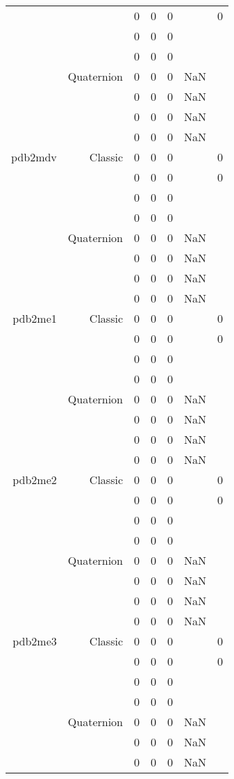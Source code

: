 \begin{xltabular}{\textwidth}{r|rcccSc}
& & 0 & 0 & 0 & & 0 \\
& & 0 & 0 & 0 & & \\
& & 0 & 0 & 0 & & \\
& Quaternion & 0 & 0 & 0 & NaN & \\
& & 0 & 0 & 0 & NaN & \\
& & 0 & 0 & 0 & NaN & \\
& & 0 & 0 & 0 & NaN & \\ \addlinespace
pdb2mdv & Classic & 0 & 0 & 0 & & 0 \\
& & 0 & 0 & 0 & & 0 \\
& & 0 & 0 & 0 & & \\
& & 0 & 0 & 0 & & \\
& Quaternion & 0 & 0 & 0 & NaN & \\
& & 0 & 0 & 0 & NaN & \\
& & 0 & 0 & 0 & NaN & \\
& & 0 & 0 & 0 & NaN & \\ \addlinespace
pdb2me1 & Classic & 0 & 0 & 0 & & 0 \\
& & 0 & 0 & 0 & & 0 \\
& & 0 & 0 & 0 & & \\
& & 0 & 0 & 0 & & \\
& Quaternion & 0 & 0 & 0 & NaN & \\
& & 0 & 0 & 0 & NaN & \\
& & 0 & 0 & 0 & NaN & \\
& & 0 & 0 & 0 & NaN & \\ \addlinespace
pdb2me2 & Classic & 0 & 0 & 0 & & 0 \\
& & 0 & 0 & 0 & & 0 \\
& & 0 & 0 & 0 & & \\
& & 0 & 0 & 0 & & \\
& Quaternion & 0 & 0 & 0 & NaN & \\
& & 0 & 0 & 0 & NaN & \\
& & 0 & 0 & 0 & NaN & \\
& & 0 & 0 & 0 & NaN & \\ \addlinespace
pdb2me3 & Classic & 0 & 0 & 0 & & 0 \\
& & 0 & 0 & 0 & & 0 \\
& & 0 & 0 & 0 & & \\
& & 0 & 0 & 0 & & \\
& Quaternion & 0 & 0 & 0 & NaN & \\
& & 0 & 0 & 0 & NaN & \\
& & 0 & 0 & 0 & NaN & \\

\end{xltabular}
